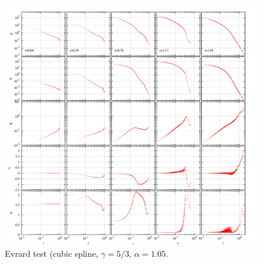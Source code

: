 \documentclass[fleqn,dvipdfmx]{article}
\begin{document}
\begin{figure}
  \begin{center}
    \includegraphics[width=16cm,bb=0 0 2120 2000]{fig/evrard/draw.png}
  \end{center}
  \caption{Evrard test (cubic spline, $\gamma=5/3$, $\alpha=1.05$.}
\end{figure}
\end{document}
